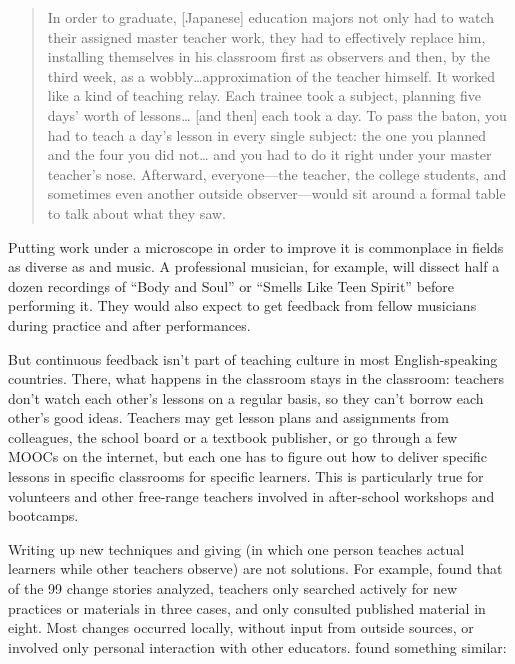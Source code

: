 \begin{quote}

  In order to graduate,
  [Japanese] education majors not only had to watch their assigned master teacher work,
  they had to effectively replace him,
  installing themselves in his classroom first as observers and then,
  by the third week,
  as a wobbly{\ldots}approximation of the teacher himself.
  It worked like a kind of teaching relay.
  Each trainee took a subject,
  planning five days' worth of lessons{\ldots} [and then] each took a day.
  To pass the baton,
  you had to teach a day's lesson in every single subject:
  the one you planned and the four you did not{\ldots}
  and you had to do it right under your master teacher's nose.
  Afterward, everyone---the teacher, the college students,
  and sometimes even another outside observer---would sit around a formal table
  to talk about what they saw.

\end{quote}

Putting work under a microscope in order to improve it is commonplace
in fields as diverse as  and music.
A professional musician,
for example,
will dissect half a dozen recordings of ``Body and Soul'' or ``Smells Like Teen Spirit'' before performing it.
They would also expect to get feedback from fellow musicians during practice and after performances.

But continuous feedback isn't part of teaching culture in most English-speaking countries.
There,
what happens in the classroom stays in the classroom:
teachers don't watch each other's lessons on a regular basis,
so they can't borrow each other's good ideas.
Teachers may get lesson plans and assignments from colleagues,
the school board or a textbook publisher,
or go through a few MOOCs on the internet,
but each one has to figure out
how to deliver specific lessons in specific classrooms for specific learners.
This is particularly true for volunteers and other free-range teachers
involved in after-school workshops and bootcamps.

Writing up new techniques
and giving 
(in which one person teaches actual learners while other teachers observe)
are not solutions.
For example,
\cite{Finc2007,Finc2012} found that of the 99 change stories analyzed,
teachers only searched actively for new practices or materials in three cases,
and only consulted published material in eight.
Most changes occurred locally,
without input from outside sources,
or involved only personal interaction with other educators.
\cite{Bark2015} found something similar:

